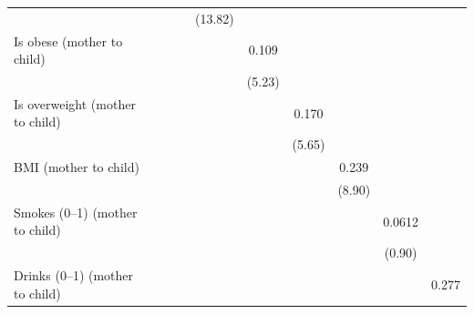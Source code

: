 \begin{table}[htbp]
\begin{tabular}{l*{9}{c}}
            &                     &                     &                     &     (13.82)         &                     &                     &                     &                     &                     \\
Is obese (mother to child)&                     &                     &                     &                     &       0.109\sym{***}&                     &                     &                     &                     \\
            &                     &                     &                     &                     &      (5.23)         &                     &                     &                     &                     \\
Is overweight (mother to child)&                     &                     &                     &                     &                     &       0.170\sym{***}&                     &                     &                     \\
            &                     &                     &                     &                     &                     &      (5.65)         &                     &                     &                     \\
BMI (mother to child)&                     &                     &                     &                     &                     &                     &       0.239\sym{***}&                     &                     \\
            &                     &                     &                     &                     &                     &                     &      (8.90)         &                     &                     \\
Smokes (0–1) (mother to child)&                     &                     &                     &                     &                     &                     &                     &      0.0612         &                     \\
            &                     &                     &                     &                     &                     &                     &                     &      (0.90)         &                     \\
Drinks (0–1) (mother to child)&                     &                     &                     &                     &                     &                     &                     &                     &       0.277\sym{***}\\

\end{tabular}
\end{table}

